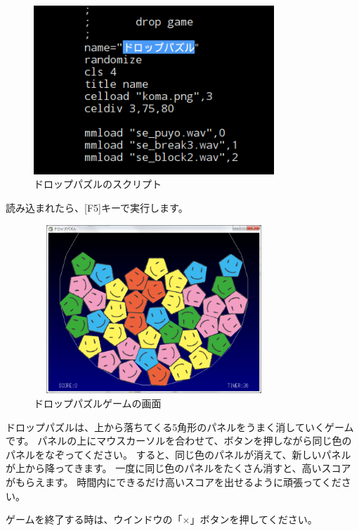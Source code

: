\begin{figure}[H]
  \begin{center}
    \includegraphics[keepaspectratio,width=9.049cm,height=6.346cm]{images/chap02/text02-img014.png}
    \caption{ドロップパズルのスクリプト}
  \end{center}
  \label{fig:drop_script}
\end{figure}

\noindent
読み込まれたら、[F5]キーで実行します。

\begin{figure}[H]
  \begin{center}
    \includegraphics[keepaspectratio,width=9.049cm,height=6.346cm]{images/chap02/text02-img015.png}
    \caption{ドロップパズルゲームの画面}
  \end{center}
  \label{fig:drop_display}
\end{figure}

ドロップパズルは、上から落ちてくる5角形のパネルをうまく消していくゲームです。
パネルの上にマウスカーソルを合わせて、ボタンを押しながら同じ色のパネルをなぞってください。
すると、同じ色のパネルが消えて、新しいパネルが上から降ってきます。
一度に同じ色のパネルをたくさん消すと、高いスコアがもらえます。
時間内にできるだけ高いスコアを出せるように頑張ってください。

ゲームを終了する時は、ウインドウの「×」ボタンを押してください。
\clearpage


